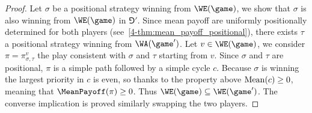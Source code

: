 \begin{proof}
Let $\sigma$ be a positional strategy winning from $\WE(\game)$, we show that $\sigma$ is also winning from $\WE(\game)$ in $\Game'$.
Since mean payoff are uniformly positionally determined for both players (see~\cref{4-thm:mean_payoff_positional}),
there exists $\tau$ a positional strategy winning from $\WA(\game')$.
Let $v \in \WE(\game)$, we consider $\pi = \pi^v_{\sigma,\tau}$ the play consistent with $\sigma$ and $\tau$ starting from $v$.
Since $\sigma$ and $\tau$ are positional, $\pi$ is a simple path followed by a simple cycle $c$.
Because $\sigma$ is winning the largest priority in $c$ is even, 
so thanks to the property above $\mathrm{Mean}(c) \ge 0$, meaning that $\MeanPayoff(\pi) \ge 0$.
Thus $\WE(\game) \subseteq \WE(\game')$.
The converse implication is proved similarly swapping the two players.
%
%
\end{proof}

